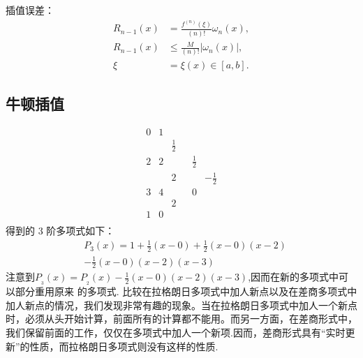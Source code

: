 \documentclass[UTF8,5pt,a4paper]{ctexart} %
\begin{document}
\begin{multicols}{4}
插值误差：
\begin{align*}
    R_{n-1}(x) &= \frac{f^{(n)}(\xi)}{(n)!}\omega_{n}(x), \\
    R_{n-1}(x) &\leq \frac{M}{(n)!}|\omega_{n}(x)|, \\
    \xi &= \xi(x) \in [a,b].
    \end{align*}
\subsection{牛顿插值}
$$
\begin{array}{c|ccccc}
    0 & 1 &&&& \\
    & & \frac{1}{2} &&& \\
    2 & 2 &&& \frac{1}{2} & \\
    & &  2 &&& -\frac{1}{2} \\
    3 & 4 &&& 0 & \\
    & & 2 &&& \\
    1 & 0 &&&& \\
    \end{array}
    $$
得到的 3 阶多项式如下：
$$\begin{aligned}
&P_3(x)=1+\frac12(x-0)+\frac12(x-0)(x-2)\\
&-\frac12(x-0)(x-2)(x-3)
\end{aligned}$$
注意到$P_{_3}(x)=P_{_2}(x)-\frac{1}{2}(x-0)(x-2)(x-3)$,因而在新的多项式中可以部分重用原来
的多项式.
比较在拉格朗日多项式中加人新点以及在差商多项式中加人新点的情况，我们发现非常有趣的现象。当在拉格朗日多项式中加人一个新点时，必须从头开始计算，前面所有的计算都不能用。而另一方面，在差商形式中，我们保留前面的工作，仅仅在多项式中加人一个新项.因而，差商形式具有“实时更新”的性质，而拉格朗日多项式则没有这样的性质.

\end{multicols}
\end{document}
